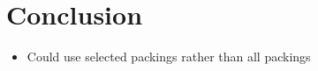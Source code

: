 \documentclass{elsarticle}
\begin{document}
\section{Conclusion}
\label{sec:conclusion}

{\color{myPurple}
\begin{itemize}[leftmargin=*]
	\item Could use selected packings rather than all packings
\end{itemize}
}

\begin{comment}


\end{comment}
\end{document}
